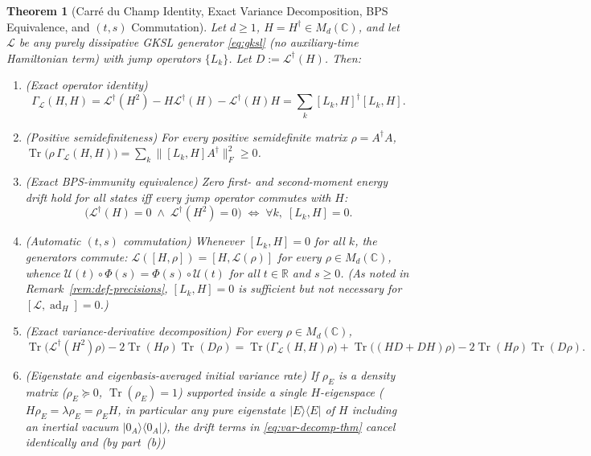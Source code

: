 \documentclass[11pt,a4paper]{article}
\newtheorem{theorem}{Theorem}
\theoremstyle{definition}
\theoremstyle{remark}
\newcommand{\Tr}{\operatorname{Tr}}
\newcommand{\ad}{\operatorname{ad}}
\newcommand{\cL}{\mathcal{L}}
\newcommand{\cU}{\mathcal{U}}
\newcommand{\bbC}{\mathbb{C}}
\newcommand{\bbR}{\mathbb{R}}
\newcommand{\1}{\mathbf{1}}
\newcommand{\normF}[1]{\|#1\|_F}
\begin{document}
\begin{theorem}[Carr\'e du Champ Identity, Exact Variance Decomposition, BPS Equivalence, and $(t,s)$ Commutation]\label{thm:bps}
Let $d \ge 1$, $H = H^\dagger \in M_d(\bbC)$, and let $\cL$ be any purely dissipative GKSL generator \eqref{eq:gksl} (no auxiliary-time Hamiltonian term) with jump operators $\{L_k\}$. Let $D := \cL^\dagger(H)$. Then:
\begin{enumerate}
  \item[(a)] \emph{(Exact operator identity)}
  \begin{equation}\label{eq:cdc-id}
    \Gamma_{\cL}(H, H) = \cL^\dagger(H^2) - H\cL^\dagger(H) - \cL^\dagger(H)H = \sum_k [L_k, H]^\dagger [L_k, H].
  \end{equation}
  \item[(b)] \emph{(Positive semidefiniteness)} For every positive semidefinite matrix $\rho = A^\dagger A$, $\Tr\bigl(\rho\,\Gamma_{\cL}(H,H)\bigr) = \sum_k \normF{[L_k, H] A^\dagger}^2 \ge 0$.
  \item[(c)] \emph{(Exact BPS-immunity equivalence)} Zero first- and second-moment energy drift hold for all states iff every jump operator commutes with $H$:
  \begin{equation}\label{eq:bps-iff}
    \bigl(\cL^\dagger(H) = 0 \;\land\; \cL^\dagger(H^2) = 0\bigr) \;\Longleftrightarrow\; \forall k,\; [L_k, H] = 0.
  \end{equation}
  \item[(d)] \emph{(Automatic $(t,s)$ commutation)} Whenever $[L_k, H] = 0$ for all $k$, the generators commute: $\cL([H,\rho]) = [H, \cL(\rho)]$ for every $\rho \in M_d(\bbC)$, whence $\cU(t)\circ\allowbreak\Phi(s) = \allowbreak \Phi(s)\circ\allowbreak\cU(t)$ for all $t \in \bbR$ and $s \ge 0$. (As noted in Remark~\ref{rem:def-precisions}, $[L_k,H]=0$ is sufficient but not necessary for $[\cL,\allowbreak\ad_H]=0$.)
  \item[(e)] \emph{(Exact variance-derivative decomposition)} For every $\rho \in M_d(\bbC)$,
  \begin{equation}\label{eq:var-decomp-thm}
    \Tr\bigl(\cL^\dagger(H^2)\rho\bigr) - 2\Tr(H\rho)\Tr(D\rho)
    = \Tr\bigl(\Gamma_{\cL}(H,H)\rho\bigr) + \Tr\bigl((HD + DH)\rho\bigr) - 2\Tr(H\rho)\Tr(D\rho).
  \end{equation}
  \item[(f)] \emph{(Eigenstate and eigenbasis-averaged initial variance rate)} If $\rho_E$ is a density matrix ($\rho_E \succeq 0$, $\Tr(\rho_E) = 1$) supported inside a single $H$-eigenspace ($H\rho_E = \lambda\rho_E = \rho_E H$, in particular any pure eigenstate $|E\rangle\langle E|$ of $H$ including an inertial vacuum $|0_A\rangle\langle 0_A|$), the drift terms in \eqref{eq:var-decomp-thm} cancel identically and (by part~(b))

\end{enumerate}
\end{theorem}
\end{document}
